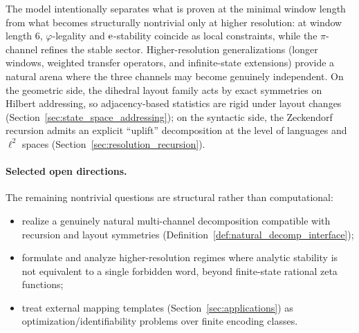 The model intentionally separates what is proven at the minimal window length from what becomes structurally nontrivial only at higher resolution:
at window length $6$, $\varphi$-legality and $\mathrm{e}$-stability coincide as local constraints, while the $\pi$-channel refines the stable sector.
Higher-resolution generalizations (longer windows, weighted transfer operators, and infinite-state extensions) provide a natural arena where the three channels may become genuinely independent.
On the geometric side, the dihedral layout family acts by exact symmetries on Hilbert addressing, so adjacency-based statistics are rigid under layout changes (Section~\ref{sec:state_space_addressing}); on the syntactic side, the Zeckendorf recursion admits an explicit ``uplift'' decomposition at the level of languages and $\ell^2$ spaces (Section~\ref{sec:resolution_recursion}).

\paragraph{Selected open directions.}
The remaining nontrivial questions are structural rather than computational:
\begin{itemize}
\item realize a genuinely natural multi-channel decomposition compatible with recursion and layout symmetries (Definition~\ref{def:natural_decomp_interface});
\item formulate and analyze higher-resolution regimes where analytic stability is not equivalent to a single forbidden word, beyond finite-state rational zeta functions;
\item treat external mapping templates (Section~\ref{sec:applications}) as optimization/identifiability problems over finite encoding classes.
\end{itemize}


